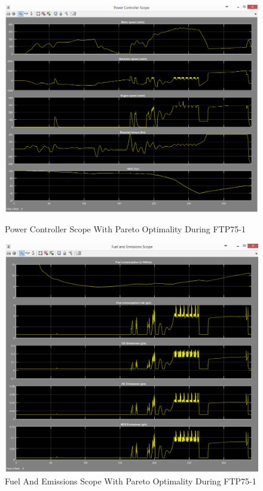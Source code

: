 \begin{figure}[hp]
\centering
\includegraphics[scale=0.45]{figures/Pareto/FTP75-1/powerController30Juni}
\caption{Power Controller Scope With Pareto Optimality During FTP75-1}
\label{fig:pcpo1}
\includegraphics[scale=0.48]{figures/Pareto/FTP75-1/fuelEmissions30Juni}
\caption{Fuel And Emissions Scope With Pareto Optimality During FTP75-1}
\label{fig:fepo1}
\end{figure}


